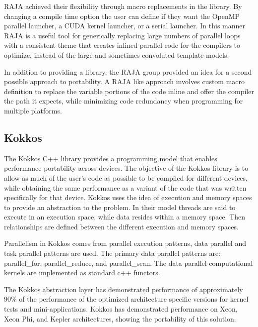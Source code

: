 RAJA achieved their flexibility through macro replacements in the library.
%
By changing a compile time option the user can define if they want the OpenMP parallel launcher, a CUDA kernel launcher, or a serial launcher.
%
In this manner RAJA is a useful tool for generically replacing large numbers of parallel loops with a consistent theme that creates inlined parallel code for the compilers to optimize, instead of the large and sometimes convoluted template models.
%
\cite{hornung2014raja}
\cite{hornung2016raja}

In addition to providing a library, the RAJA group provided an idea for a second possible approach to portability.
%
A RAJA like approach involves custom macro definition to replace the variable portions of the code inline and offer the compiler the path it expects, while minimizing code redundancy when programming for multiple platforms.

\subsection*{\textbf{Kokkos}}

The Kokkos C++ library provides a programming model that enables performance portability across devices.
%
The objective of the Kokkos library is to allow as much of the user's code as possible to be compiled for different devices, while obtaining the same performance as a variant of the code that was written specifically for that device.
%
Kokkos uses the idea of execution and memory spaces to provide an abstraction to the problem.
%
In their model threads are said to execute in an execution space, while data resides within a memory space.
%
Then relationships are defined between the different execution and memory spaces.
\cite{edwards2014kokkos}

Parallelism in Kokkos comes from parallel execution patterns, data parallel and task parallel patterns are used.
%
The primary data parallel patterns are: parallel\_for, parallel\_reduce, and parallel\_scan.
%
The data parallel computational kernels are implemented as standard c++ functors.
%

The Kokkos abstraction layer has demonstrated performance of approximately 90\% of the performance of the optimized architecture specific versions for kernel tests and mini-applications.
%
Kokkos has demonstrated performance on Xeon, Xeon Phi, and Kepler architectures, showing the portability of this solution.
\cite{edwards2014kokkos}
\cite{edwards2012manycore}

